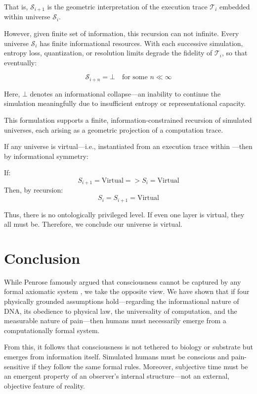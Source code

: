 \documentclass[11pt]{article}
\begin{document}
That is, \( \mathcal{S}_{i+1} \) is the geometric interpretation of the execution trace \( \mathcal{T}_i \) embedded within universe \( \mathcal{S}_i \).

However, given finite set of information, this recursion can not infinite. Every universe \( \mathcal{S}_i \) has finite informational resources. With each successive simulation, entropy loss, quantization, or resolution limits degrade the fidelity of \( \mathcal{T}_i \), so that eventually:

\[
  \mathcal{S}_{i+n} = \bot \quad \text{for some } n \ll \infty
\]

Here, \( \bot \) denotes an informational collapse—an inability to continue the simulation meaningfully due to insufficient entropy or representational capacity.

This formulation supports a finite, information-constrained recursion of simulated universes, each arising as a geometric projection of a computation trace.

If any universe  is virtual—i.e., instantiated from an execution trace within —then by informational symmetry:

If:
\[
  S_{i+1} = \text{Virtual} => S_{i} = \text{Virtual}
\]
Then, by recursion:
\[
  S_i = S_{i+1} = \text{Virtual}
\]

Thus, there is no ontologically privileged level. If even one layer is virtual, they all must be. Therefore, we conclude our universe is virtual.



\section{Conclusion}

While Penrose famously argued that consciousness cannot be captured by any formal axiomatic system \cite{penrose1989emperor}, we take the opposite view. We have shown that if four physically grounded assumptions hold—regarding the informational nature of DNA, its obedience to physical law, the universality of computation, and the measurable nature of pain—then humans must necessarily emerge from a computationally formal system.

From this, it follows that consciousness is not tethered to biology or substrate but emerges from information itself. Simulated humans must be conscious and pain-sensitive if they follow the same formal rules. Moreover, subjective time must be an emergent property of an observer’s internal structure—not an external, objective feature of reality.
\end{document}
